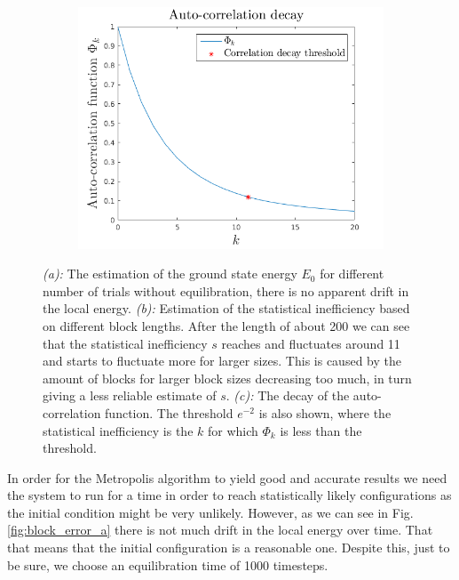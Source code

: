 \begin{figure}[H]
\begin{subfigure}[b]{0.7\textwidth}
		\includegraphics[width=\textwidth]{graphics/task2/auto_corr.png}
		\caption{}
		\label{fig:block_error_c}
	\end{subfigure}
	\caption{\textit{(a):} The estimation of the ground state energy $E_0$ for different number of trials without equilibration, there is no apparent drift in the local energy. \textit{(b):} Estimation of the statistical inefficiency based on different block lengths. After the length of about 200 we can see that the statistical inefficiency $s$ reaches and fluctuates around 11 and starts to fluctuate more for larger sizes. This is caused by the amount of blocks for larger block sizes decreasing too much, in turn giving a less reliable estimate of $s$. \textit{(c):} The decay of the auto-correlation function. The threshold $e^{-2}$ is also shown, where the statistical inefficiency is the $k$ for which $\Phi_k$ is less than the threshold.}
	\label{fig:block_error}
\end{figure}

In order for the Metropolis algorithm to yield good and accurate results we need the system to run for a time in order to reach statistically likely configurations as the initial condition might be very unlikely. However, as we can see in Fig. \ref{fig:block_error_a} there is not much drift in the local energy over time. That that means that the initial configuration is a reasonable one. Despite this, just to be sure, we choose an equilibration time of 1000 timesteps.


